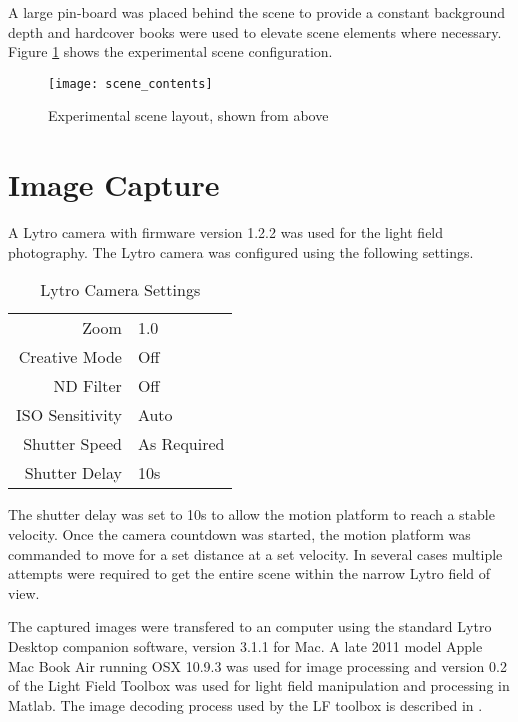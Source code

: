 A large pin-board was placed behind the scene to provide a constant background depth and hardcover books were used to elevate scene elements where necessary.
Figure \ref{fig:scene_description} shows the experimental scene configuration.

\begin{figure}[h]
\centering
\texttt{[image: scene\_contents]}
\caption[Experimental scene layout]{Experimental scene layout, shown from above}
\label{fig:scene_description}
\end{figure}


\section{Image Capture}
\label{sec:image_capture}

A Lytro camera with firmware version 1.2.2 was used for the light field photography.
The Lytro camera was configured using the following settings.

\begin{table}[h]
\centering
\caption{Lytro Camera Settings}
\label{tab:lytro_settings}
\begin{tabular}{r | l}
Zoom & 1.0 \\
Creative Mode & Off \\
ND Filter & Off \\
ISO Sensitivity & Auto \\
Shutter Speed & As Required \\
Shutter Delay & 10s \\
\end{tabular}
\end{table}

The shutter delay was set to 10s to allow the motion platform to reach a stable velocity.
Once the camera countdown was started, the motion platform was commanded to move for a set distance at a set velocity.
In several cases multiple attempts were required to get the entire scene within the narrow Lytro field of view.

The captured images were transfered to an computer using the standard Lytro Desktop companion software, version 3.1.1 for Mac.
A late 2011 model Apple Mac Book Air running OSX 10.9.3 was used for image processing and version 0.2 of the Light Field Toolbox \cite{dansereau2013toolbox} was used for light field manipulation and processing in Matlab.
The image decoding process used by the LF toolbox is described in \cite{dansereau2013decoding}.

